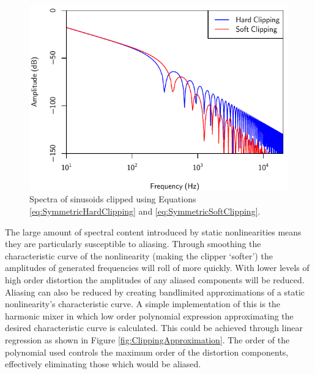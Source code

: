 			\begin{figure}[h!]
				\centering
				\includegraphics{chapter5/Images/ClippingSpectra.pdf}
				\caption{Spectra of sinusoids clipped using Equations \ref{eq:SymmetricHardClipping} and
			                 \ref{eq:SymmetricSoftClipping}.}
				\label{fig:ClippingSpectra}
			\end{figure}

			The large amount of spectral content introduced by static nonlinearities means they are
			particularly susceptible to aliasing. Through smoothing the characteristic curve of the
			nonlinearity (making the clipper `softer') the amplitudes of generated frequencies will roll of
			more quickly. With lower levels of high order distortion the amplitudes of any aliased components
			will be reduced. Aliasing can also be reduced by creating bandlimited approximations of a static
			nonlinearity's characteristic curve. A simple implementation of this is the harmonic mixer
			\citep{schattschneider1999discrete} in which low order polynomial expression approximating the
			desired characteristic curve is calculated.  This could be achieved through linear regression as
			shown in Figure \ref{fig:ClippingApproximation}.  The order of the polynomial used controls the
			maximum order of the distortion components, effectively eliminating those which would be aliased.

